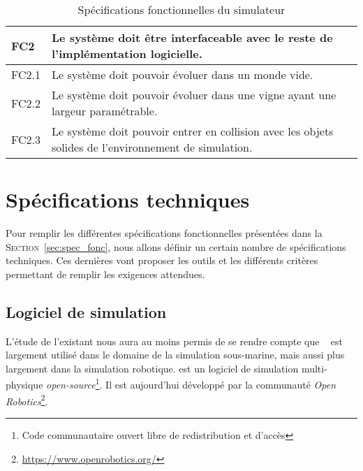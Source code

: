 \begin{table}[!htb]
\begin{adjustbox}{max width=\textwidth}
\begin{tabularx}{\textwidth}{|lX|}
                    \hline \hline
            
                    \cellcolor{orange!40}\textbf{FC2}&\cellcolor{orange!30} Le système doit être interfaceable avec le reste de l'implémentation logicielle. \\
                    \hline
                    \cellcolor{gray!10}FC2.1& Le système doit pouvoir évoluer dans un monde vide. \\
                    \hline
                    \cellcolor{gray!10}FC2.2& Le système doit pouvoir évoluer dans une vigne ayant une largeur paramétrable. \\
                    \hline
                    \cellcolor{gray!10}FC2.3& Le système doit pouvoir entrer en collision avec les objets solides de l'environnement de simulation. \\
                    \hline
                \end{tabularx}
            \end{adjustbox}
            \caption{Spécifications fonctionnelles du simulateur}
            \label{table:specs}
        \end{table}    

    \section{Spécifications techniques}

        Pour remplir les différentes spécifications fonctionnelles présentées dans la \textsc{Section}~\ref{sec:spec_fonc}, nous allons définir un certain nombre de spécifications techniques. Ces dernières vont proposer les outils et les différents critères permettant de remplir les exigences attendues.

        \subsection{Logiciel de simulation}

            L'étude de l'existant nous aura au moins permis de se rendre compte que \gazebo{}~\cite{Koenig-gazebo} est largement utilisé dans le domaine de la simulation sous-marine, mais aussi plus largement dans la simulation robotique. \gazebo{} est un logiciel de simulation multi-physique \textit{open-source}\footnote{Code communautaire ouvert libre de redistribution et d'accès}. Il est aujourd'hui développé par la communauté \textit{Open Robotics}\footnote{\url{https://www.openrobotics.org/}}.
            
